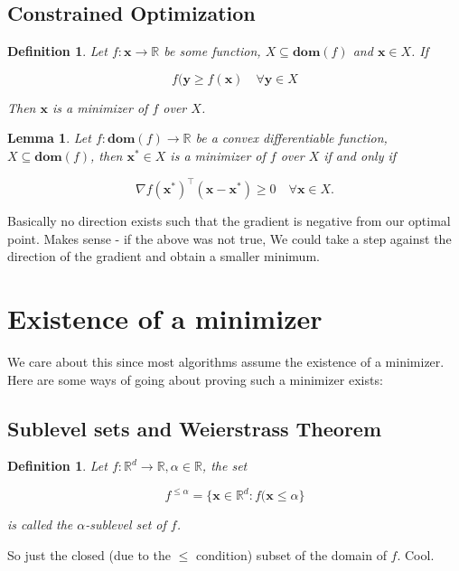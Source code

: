 \documentclass{article}
\newtheorem{definition}[theorem]{Definition}
\newtheorem{lemma}[theorem]{Lemma}
\begin{document}
	\subsection{Constrained Optimization}
	
		\begin{definition}
			Let $f:\mathbf{x}\to\mathbb{R}$ be some function, $X\subseteq\mathbf{dom}(f)$ and $\mathbf{x}\in X$. If
			
			\[ f(\mathbf{y} \ge f(\mathbf{x})\quad\forall\mathbf{y}\in X \]
			
			Then $\mathbf{x}$ is a minimizer of $f$ over $X$.
		\end{definition}
		
		\begin{lemma}
			Let $f:\mathbf{dom}(f)\to\mathbb{R}$ be a convex differentiable function, $X\subseteq\mathbf{dom}(f)$, then $\mathbf{x^*}\in X$ is a minimizer of $f$ over $X$ if and only if
			
			\[ \nabla f(\mathbf{x^*})^\top (\mathbf{x - x^*}) \ge 0\quad \forall\mathbf{x}\in X. \]
		\end{lemma}
		
		Basically no direction exists such that the gradient is negative from our optimal point. Makes sense - if the above was not true, We could take a step against the direction of the gradient and obtain a smaller minimum.
		
\section{Existence of a minimizer}

	We care about this since most algorithms assume the existence of a minimizer. Here are some ways of going about proving such a minimizer exists:
	
	\subsection{Sublevel sets and Weierstrass Theorem}
	
		\begin{definition}
			Let $f:\mathbb{R}^d\to\mathbb{R}, \alpha\in\mathbb{R}$, the set
			
			\[ f^{\le\alpha} = \{\mathbf{x}\in\mathbb{R}^d : f(\mathbf{x} \le \alpha \}  \]
			
			is called the $\alpha$-sublevel set of $f$.
		\end{definition}
		
		So just the closed (due to the $\le$ condition) subset of the domain of $f$. Cool.
		
\end{document}

